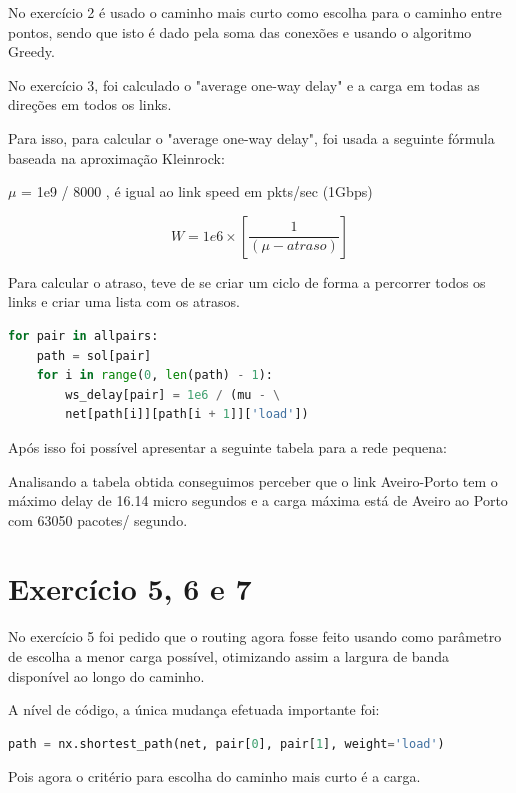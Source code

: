 \documentclass[pdftex,12pt,a4paper]{report}
\begin{document}
No exercício 2 é usado o caminho mais curto como escolha para o caminho entre pontos, sendo que isto é dado pela soma das conexões e usando o algoritmo Greedy.

No exercício 3, foi calculado o "average one-way delay" e a carga em todas as direções em todos os links.

Para isso, para calcular o "average one-way delay", foi usada a seguinte fórmula baseada na aproximação Kleinrock:

$\mu$ = 1e9 / 8000 , é igual ao link speed em pkts/sec (1Gbps)

\[W = 1e6\times\left[\frac{1}{\left(\mu-atraso\right)}\right]\]

Para calcular o atraso, teve de se criar um ciclo de forma a percorrer todos os links e criar uma lista com os atrasos.

\begin{lstlisting}[language=python]
for pair in allpairs:
    path = sol[pair]
    for i in range(0, len(path) - 1):
        ws_delay[pair] = 1e6 / (mu - \
        net[path[i]][path[i + 1]]['load'])
\end{lstlisting}

Após isso foi possível apresentar a seguinte tabela para a rede pequena:



Analisando a tabela obtida conseguimos perceber que o link Aveiro-Porto tem o máximo delay de 16.14 micro segundos e a carga máxima está de Aveiro ao Porto com 63050 pacotes/ segundo.





\newpage

\section{Exercício 5, 6 e 7}

No exercício 5 foi pedido que o routing agora fosse feito usando como parâmetro de escolha a menor carga possível, otimizando assim a largura de banda disponível  ao longo do caminho.

A nível de código, a única mudança efetuada importante foi:
\begin{lstlisting}[language=python]
path = nx.shortest_path(net, pair[0], pair[1], weight='load')
\end{lstlisting}

Pois agora o critério para escolha do caminho mais curto é a carga.
\end{document}
